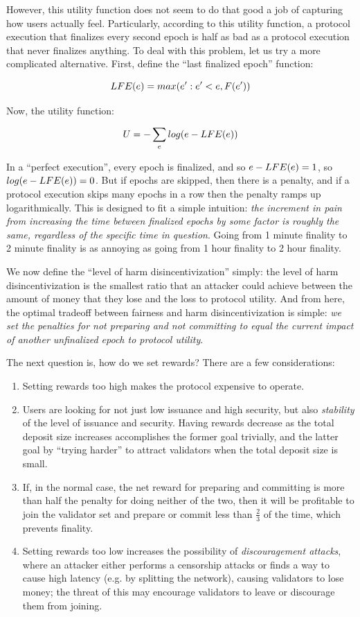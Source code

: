 \documentclass[12pt, final]{article}
\newcommand{\epoch}{\ensuremath{e}\space}
\begin{document}
However, this utility function does not seem to do that good a job of capturing how users actually feel. Particularly, according to this utility function, a protocol execution that finalizes every second epoch is half as bad as a protocol execution that never finalizes anything. To deal with this problem, let us try a more complicated alternative. First, define the ``last finalized epoch'' function:

$$LFE(\epoch) = max(\epoch': \epoch' < \epoch, F(\epoch'))$$

Now, the utility function:

$$U = -\sum_{\epoch} log(\epoch - LFE(\epoch))$$

In a ``perfect execution'', every epoch is finalized, and so $\epoch - LFE(\epoch) = 1$, so $log(\epoch - LFE(\epoch)) = 0$. But if epochs are skipped, then there is a penalty, and if a protocol execution skips many epochs in a row then the penalty ramps up logarithmically. This is designed to fit a simple intuition: \textit{the increment in pain from increasing the time between finalized epochs by some factor is roughly the same, regardless of the specific time in question}. Going from 1 minute finality to 2 minute finality is as annoying as going from 1 hour finality to 2 hour finality.

We now define the ``level of harm disincentivization'' simply: the level of harm disincentivization is the smallest ratio that an attacker could achieve between the amount of money that they lose and the loss to protocol utility. And from here, the optimal tradeoff between fairness and harm disincentivization is simple: \textit{we set the penalties for not preparing and not committing to equal the current impact of another unfinalized epoch to protocol utility}.

The next question is, how do we set rewards? There are a few considerations:

\begin{enumerate}
\item Setting rewards too high makes the protocol expensive to operate.
\item Users are looking for not just low issuance and high security, but also \textit{stability} of the level of issuance and security. Having rewards decrease as the total deposit size increases accomplishes the former goal trivially, and the latter goal by ``trying harder'' to attract validators when the total deposit size is small.
\item If, in the normal case, the net reward for preparing and committing is more than half the penalty for doing neither of the two, then it will be profitable to join the validator set and prepare or commit less than $\frac{2}{3}$ of the time, which prevents finality.
\item Setting rewards too low increases the possibility of \textit{discouragement attacks}, where an attacker either performs a censorship attacks or finds a way to cause high latency (e.g. by splitting the network), causing validators to lose money; the threat of this may encourage validators to leave or discourage them from joining.
\end{enumerate}
\end{document}
